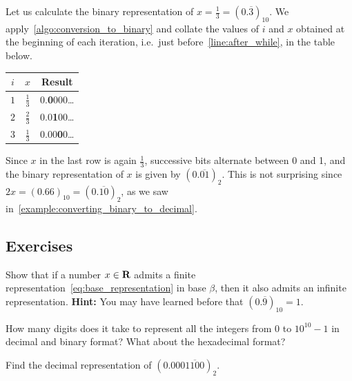 \begin{example}
    Let us calculate the binary representation of $x = \frac{1}{3} = (0.\overline{3})_{10}$.
    We apply~\cref{algo:conversion_to_binary} and collate the values of $i$ and $x$ obtained at the beginning of each iteration,
    i.e.\ just before~\cref{line:after_while}, in the table below.
    \begin{center}
    \begin{tabular}{|c|c|c|}
        \hline
        $i$ & $x$ & Result \\ \hline
        $1$ & $\frac{1}{3}$ & 0.\textbf{0}000\dots \\ \hline
        $2$ & $\frac{2}{3}$ & 0.0\textbf{1}00\dots \\ \hline
        $3$ & $\frac{1}{3}$ & 0.00\textbf{0}0\dots \\ \hline
    \end{tabular}
    \end{center}
    Since $x$ in the last row is again $\frac{1}{3}$,
    successive bits alternate between 0 and 1,
    and the binary representation of $x$ is given by $(0.\overline{01})_2$.
    This is not surprising since $2x = (0.66)_{10} = (0.\overline{10})_2$,
    as we saw in~\cref{example:converting_binary_to_decimal}.
\end{example}

\subsection{Exercises}%

\begin{exercise}
    \label{exercise:non_unique_representation}
    Show that if a number $x \in \mathbf R$ admits a finite representation~\eqref{eq:base_representation} in base $\beta$,
    then it also admits an infinite representation.
    \textbf{Hint:} You may have learned before that $(0.\overline 9)_{10} = 1$.
\end{exercise}

\begin{exercise}
    How many digits does it take to represent all the integers from 0 to $10^{10} - 1$ in decimal and binary format?
    What about the hexadecimal format?
\end{exercise}

\begin{exercise}
    Find the decimal representation of $(0.000\overline{1100})_2$.
\end{exercise}

